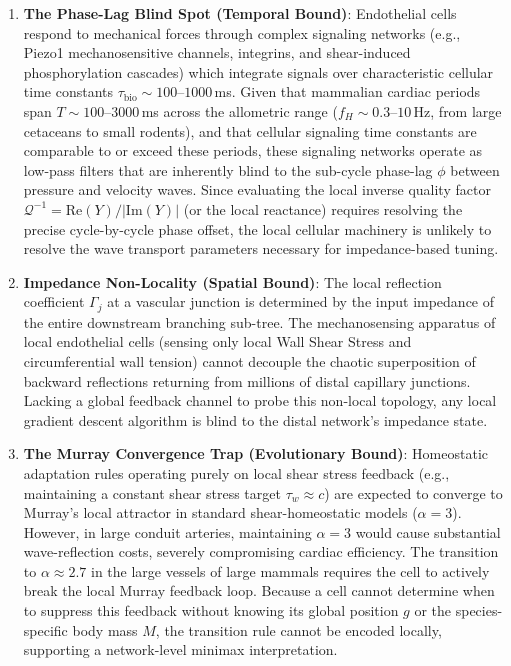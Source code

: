 \begin{enumerate}
    \item
\textbf{The Phase-Lag Blind Spot (Temporal Bound)}: Endothelial cells respond to
mechanical forces through complex signaling networks (e.g., Piezo1
mechanosensitive channels, integrins, and shear-induced phosphorylation
cascades) which integrate signals over characteristic cellular time constants
$\tau_{\mathrm{bio}} \sim 100\text{--}1000\,$ms. Given that mammalian cardiac
periods span $T \sim 100\text{--}3000\,$ms across the allometric range ($f_H
\sim 0.3\text{--}10\,$Hz, from large cetaceans to small rodents), and that
cellular signaling time constants are comparable to or exceed these periods,
these signaling networks operate as low-pass filters that are inherently blind
to the sub-cycle phase-lag $\phi$ between pressure and velocity waves. Since
evaluating the local inverse quality factor $\mathcal{Q}^{-1} =
\mathrm{Re}(Y)/|\mathrm{Im}(Y)|$ (or the local reactance) requires resolving the
precise cycle-by-cycle phase offset, the local cellular machinery is
unlikely to resolve the wave transport parameters necessary for impedance-based
tuning.
    
    \item
\textbf{Impedance Non-Locality (Spatial Bound)}: The local reflection
coefficient $\Gamma_j$ at a vascular junction is determined by the input
impedance of the entire downstream branching sub-tree. The mechanosensing
apparatus of local endothelial cells (sensing only local Wall Shear Stress and
circumferential wall tension) cannot decouple the chaotic superposition of
backward reflections returning from millions of distal capillary junctions.
Lacking a global feedback channel to probe this non-local topology, any local
gradient descent algorithm is blind to the distal network's impedance state.
    
    \item
\textbf{The Murray Convergence Trap (Evolutionary Bound)}: Homeostatic
adaptation rules operating purely on local shear stress feedback (e.g.,
maintaining a constant shear stress target $\tau_w \approx c$) are expected
to converge to Murray's local attractor in standard shear-homeostatic models
($\alpha = 3$). However, in large conduit arteries, maintaining $\alpha=3$ would
cause substantial wave-reflection costs, severely compromising cardiac
efficiency. The transition to $\alpha \approx 2.7$ in the large vessels of large
mammals requires the cell to actively break the local Murray feedback loop.
Because a cell cannot determine when to suppress this feedback without knowing
its global position $g$ or the species-specific body mass $M$, the transition
rule cannot be encoded locally, supporting a network-level minimax
interpretation.
\end{enumerate}

